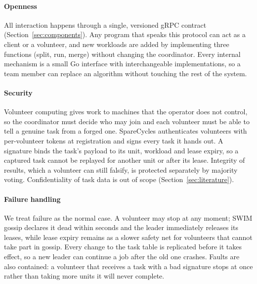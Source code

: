 \paragraph{Openness}
All interaction happens through a single, versioned gRPC contract (Section~\ref{sec:components}). Any program that speaks this protocol can act as a client or a volunteer, and new workloads are added by implementing three functions (split, run, merge) without changing the coordinator. Every internal mechanism is a small Go interface with interchangeable implementations, so a team member can replace an algorithm without touching the rest of the system.

\paragraph{Security}
Volunteer computing gives work to machines that the operator does not control, so the coordinator must decide who may join and each volunteer must be able to tell a genuine task from a forged one. SpareCycles authenticates volunteers with per-volunteer tokens at registration and signs every task it hands out. A signature binds the task's payload to its unit, workload and lease expiry, so a captured task cannot be replayed for another unit or after its lease. Integrity of results, which a volunteer can still falsify, is protected separately by majority voting. Confidentiality of task data is out of scope (Section~\ref{sec:literature}).

\paragraph{Failure handling}
We treat failure as the normal case. A volunteer may stop at any moment; SWIM gossip declares it dead within seconds and the leader immediately releases its leases, while lease expiry remains as a slower safety net for volunteers that cannot take part in gossip. Every change to the task table is replicated before it takes effect, so a new leader can continue a job after the old one crashes. Faults are also contained: a volunteer that receives a task with a bad signature stops at once rather than taking more units it will never complete.

